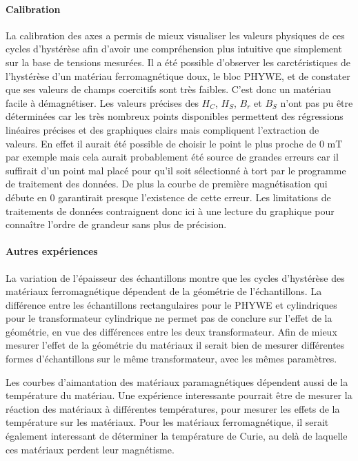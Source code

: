 \paragraph*{Calibration}
La calibration des axes a permis de mieux visualiser les valeurs physiques de ces cycles d'hystérèse afin d'avoir une compréhension plus intuitive que simplement sur la base de tensions mesurées. Il a été possible d'observer les carctéristiques de l'hystérèse d'un matériau ferromagnétique doux, le bloc PHYWE, et de constater que ses valeurs de champs coercitifs sont très faibles. C'est donc un matériau facile à démagnétiser. Les valeurs précises des \(H_C\), \(H_S\), \(B_r\) et \(B_S\) n'ont pas pu être déterminées car les très nombreux points disponibles permettent des régressions linéaires précises et des graphiques clairs mais compliquent l'extraction de valeurs. En effet il aurait été possible de choisir le point le plus proche de 0 \si{\milli\tesla} par exemple mais cela aurait probablement été source de grandes erreurs car il suffirait d'un point mal placé pour qu'il soit sélectionné à tort par le programme de traitement des données. De plus la courbe de première magnétisation qui débute en 0 garantirait presque l'existence de cette erreur. Les limitations de traitements de données contraignent donc ici à une lecture du graphique pour connaître l'ordre de grandeur sans plus de précision.

\paragraph*{Autres expériences}
La variation de l'épaisseur des échantillons montre que les cycles d'hystérèse des matériaux ferromagnétique dépendent de la géométrie de l'échantillons. La différence entre les échantillons rectangulaires pour le PHYWE et cylindriques pour le transformateur cylindrique ne permet pas de conclure sur l'effet de la géométrie, en vue des différences entre les deux transformateur. Afin de mieux mesurer l'effet de la géométrie du matériaux il serait bien de mesurer différentes formes d'échantillons sur le même transformateur, avec les mêmes paramètres.

Les courbes d'aimantation des matériaux paramagnétiques dépendent aussi de la température du matériau. Une expérience interessante pourrait être de mesurer la réaction des matériaux à différentes températures, pour mesurer les effets de la température sur les matériaux. Pour les matériaux ferromagnétique, il serait également interessant de déterminer la température de Curie, au delà de laquelle ces matériaux perdent leur magnétisme.
